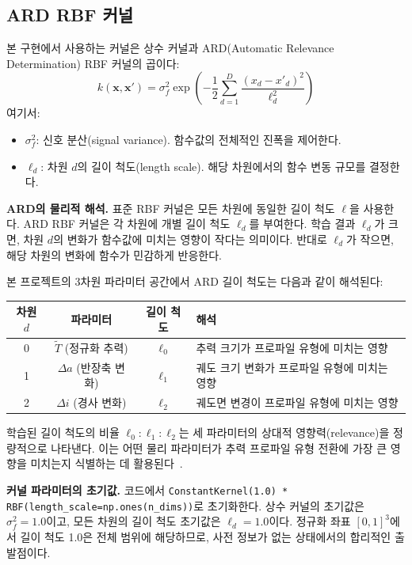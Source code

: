 \documentclass[11pt]{article}
\begin{document}
\subsection{ARD RBF 커널}

본 구현에서 사용하는 커널은 상수 커널과 ARD(Automatic Relevance Determination) RBF 커널의 곱이다:
\begin{equation}
k(\mathbf{x}, \mathbf{x}') = \sigma_f^2 \exp\left(-\frac{1}{2} \sum_{d=1}^{D} \frac{(x_d - x'_d)^2}{\ell_d^2}\right)
\label{eq:ard_rbf}
\end{equation}
여기서:
\begin{itemize}[nosep]
  \item $\sigma_f^2$: 신호 분산(signal variance). 함수값의 전체적인 진폭을 제어한다.
  \item $\ell_d$: 차원 $d$의 길이 척도(length scale). 해당 차원에서의 함수 변동 규모를 결정한다.
\end{itemize}

\textbf{ARD의 물리적 해석.}
표준 RBF 커널은 모든 차원에 동일한 길이 척도 $\ell$을 사용한다.
ARD RBF 커널은 각 차원에 개별 길이 척도 $\ell_d$를 부여한다.
학습 결과 $\ell_d$가 크면, 차원 $d$의 변화가 함수값에 미치는 영향이 작다는 의미이다.
반대로 $\ell_d$가 작으면, 해당 차원의 변화에 함수가 민감하게 반응한다.

본 프로젝트의 3차원 파라미터 공간에서 ARD 길이 척도는 다음과 같이 해석된다:

\begin{table}[h]
\centering
\begin{tabular}{cccl}
\toprule
차원 $d$ & 파라미터 & 길이 척도 & 해석 \\
\midrule
0 & $\tilde{T}$ (정규화 추력) & $\ell_0$ & 추력 크기가 프로파일 유형에 미치는 영향 \\
1 & $\Delta a$ (반장축 변화) & $\ell_1$ & 궤도 크기 변화가 프로파일 유형에 미치는 영향 \\
2 & $\Delta i$ (경사 변화) & $\ell_2$ & 궤도면 변경이 프로파일 유형에 미치는 영향 \\
\bottomrule
\end{tabular}
\end{table}

학습된 길이 척도의 비율 $\ell_0 : \ell_1 : \ell_2$는 세 파라미터의 상대적 영향력(relevance)을 정량적으로 나타낸다.
이는 어떤 물리 파라미터가 추력 프로파일 유형 전환에 가장 큰 영향을 미치는지 식별하는 데 활용된다~\cite{Lee2023}.

\textbf{커널 파라미터의 초기값.}
코드에서 \texttt{ConstantKernel(1.0) * RBF(length\_scale=np.ones(n\_dims))}로 초기화한다.
상수 커널의 초기값은 $\sigma_f^2 = 1.0$이고, 모든 차원의 길이 척도 초기값은 $\ell_d = 1.0$이다.
정규화 좌표 $[0,1]^3$에서 길이 척도 1.0은 전체 범위에 해당하므로,
사전 정보가 없는 상태에서의 합리적인 출발점이다.
\end{document}

